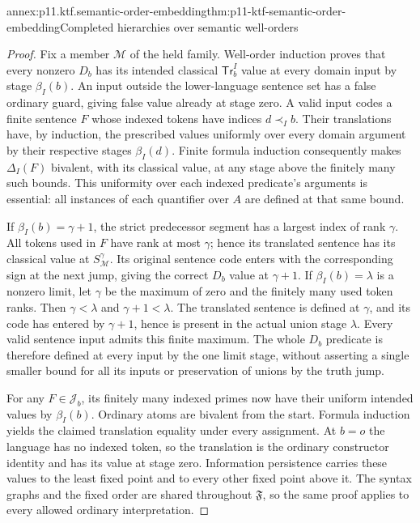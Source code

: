 \begin{annexitem}{annex:p11.ktf.semantic-order-embedding}{thm:p11-ktf-semantic-order-embedding}{Completed hierarchies over semantic well-orders}
\begin{proof}
Fix a member \(\mathcal M\) of the held family. Well-order
induction proves that every nonzero \(D_b\) has its intended
classical \(\mathsf{Tr}^{I}_b\) value at every domain input
by stage \(\beta_I(b)\). An input outside the lower-language
sentence set has a false ordinary guard, giving false value already
at stage zero. A valid input codes a finite sentence \(F\)
whose indexed tokens have indices \(d\prec_I b\). Their
translations have, by induction, the prescribed values uniformly
over every domain argument by their respective stages \(\beta_I(d)\).
Finite formula induction consequently makes \(\Delta_I(F)\)
bivalent, with its classical value, at any stage above the finitely
many such bounds. This uniformity over each indexed predicate's
arguments is essential: all instances of each quantifier over \(A\)
are defined at that same bound.

If \(\beta_I(b)=\gamma+1\), the strict predecessor segment
has a largest index of rank \(\gamma\). All tokens used in
\(F\) have rank at most \(\gamma\); hence its translated
sentence has its classical value at \(S_{\mathcal M}^{\gamma}\).
Its original sentence code enters with the corresponding sign at
the next jump, giving the correct \(D_b\) value at
\(\gamma+1\). If \(\beta_I(b)=\lambda\) is a nonzero
limit, let \(\gamma\) be the maximum of zero and the finitely
many used token ranks. Then \(\gamma<\lambda\) and
\(\gamma+1<\lambda\). The translated sentence is defined
at \(\gamma\), and its code has entered by \(\gamma+1\),
hence is present in the actual union stage \(\lambda\).
Every valid sentence input admits this finite maximum. The whole
\(D_b\) predicate is therefore defined at every input by the
one limit stage, without asserting a single smaller bound for all
its inputs or preservation of unions by the truth jump.

For any \(F\in\mathcal J_b\), its finitely many indexed
primes now have their uniform intended values by \(\beta_I(b)\).
Ordinary atoms are bivalent from the start. Formula induction yields
the claimed translation equality under every assignment. At \(b=o\)
the language has no indexed token, so the translation is the ordinary
constructor identity and has its value at stage zero. Information
persistence carries these values to the least fixed point and to
every other fixed point above it. The syntax graphs and the fixed
order are shared throughout \(\mathfrak F\), so the same proof
applies to every allowed ordinary interpretation.
\end{proof}
\end{annexitem}

